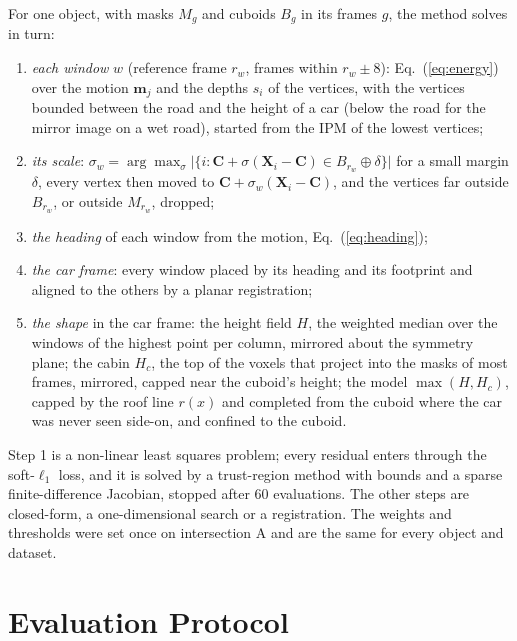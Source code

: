 \documentclass[runningheads,a4paper]{llncs}
\newcommand{\vect}[1]{\mathbf{#1}}
\begin{document}
For one object, with masks $M_g$ and cuboids $B_g$ in its frames $g$, the method solves in turn:
\begin{enumerate}
\item \emph{each window} $w$ (reference frame $r_w$, frames within $r_w \pm 8$): Eq.~(\ref{eq:energy}) over the motion
  $\vect{m}_j$ and the depths $s_i$ of the vertices, with the vertices bounded between the road and the height of a
  car (below the road for the mirror image on a wet road), started from the IPM of the lowest vertices;
\item \emph{its scale}: $\sigma_w = \arg\max_{\sigma} \big|\{ i : \vect{C} + \sigma (\vect{X}_i - \vect{C})
  \in B_{r_w} \oplus \delta \}\big|$ for a small margin $\delta$, every vertex then moved to
  $\vect{C} + \sigma_w (\vect{X}_i - \vect{C})$, and the vertices far outside $B_{r_w}$, or outside $M_{r_w}$,
  dropped;
\item \emph{the heading} of each window from the motion, Eq.~(\ref{eq:heading});
\item \emph{the car frame}: every window placed by its heading and its footprint and aligned to the others by a
  planar registration;
\item \emph{the shape} in the car frame: the height field $H$, the weighted median over the windows of the highest
  point per column, mirrored about the symmetry plane; the cabin $H_c$, the top of the voxels that project into the
  masks of most frames, mirrored, capped near the cuboid's height; the model $\max(H, H_c)$,
  capped by the roof line $r(x)$ and completed from the cuboid where the car was never seen side-on, and confined to the cuboid.
\end{enumerate}
Step 1 is a non-linear least squares problem; every residual enters through the soft-$\ell_1$ loss, and it is solved
by a trust-region method with bounds and a sparse finite-difference Jacobian, stopped after 60 evaluations. The
other steps are closed-form, a one-dimensional search or a registration. The weights and thresholds were set once on intersection A and are the same for every object and dataset.

\section{Evaluation Protocol}\label{sec:protocol}
\end{document}
